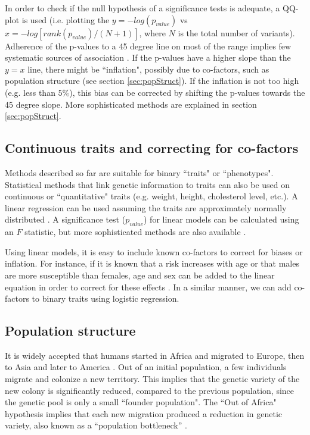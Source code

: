In order to check if the null hypothesis of a significance tests is adequate, a QQ-plot is used (i.e. plotting the $y = -log(p_{value})$ vs $x = -log[ rank(p_{value}) / (N+1) ]$, where $N$ is the total number of variants). Adherence of the p-values to a 45 degree line on most of the range implies few systematic sources of association \cite{balding2006tutorial, clarke2011basic}. If the p-values have a higher slope than the $y=x$ line, there might be ``inflation", possibly due to co-factors, such as population structure (see section \ref{sec:popStruct}). If the inflation is not too high (e.g. less than $5\%$), this bias can be corrected by shifting the p-values towards the 45 degree slope. More sophisticated methods are explained in section \ref{sec:popStruct}.

\subsection{Continuous traits and correcting for co-factors \label{sec:cofactors}}

Methods described so far are suitable for binary ``traits" or ``phenotypes". Statistical methods that link genetic information to traits can also be used on continuous or ``quantitative" traits (e.g. weight, height, cholesterol level, etc.). A linear regression can be used assuming the traits are approximately normally distributed \cite{balding2006tutorial, clarke2011basic}. A significance test ($p_{value}$) for linear models can be calculated using an $F$ statistic, but more sophisticated methods are also available \cite{balding2006tutorial, clarke2011basic}.

Using linear models, it is easy to include known co-factors to correct for biases or inflation. For instance, if it is known that a risk increases with age or that males are more susceptible than females, age and sex can be added to the linear equation in order to correct for these effects \cite{balding2006tutorial,clarke2011basic}. In a similar manner, we can add co-factors to binary traits using logistic regression.

\subsection{Population structure \label{sec:popStruct}}

It is widely accepted that humans started in Africa and migrated to Europe, then to Asia and later to America \cite{hartl1997principles}. Out of an initial population, a few individuals migrate and colonize a new territory. This implies that the genetic variety of the new colony is significantly reduced, compared to the previous population, since the genetic pool is only a small ``founder population". The ``Out of Africa" hypothesis implies that each new migration produced a reduction in genetic variety, also known as a ``population bottleneck'' \cite{hartl1997principles}.

